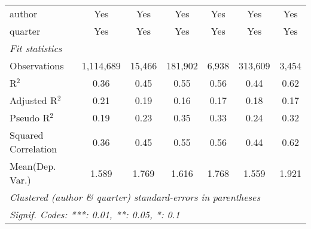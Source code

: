 \begin{tabular}{lcccccc}
   author                                                     & Yes            & Yes           & Yes           & Yes          & Yes            & Yes\\  
   quarter                                                    & Yes            & Yes           & Yes           & Yes          & Yes            & Yes\\  
   \midrule
   \emph{Fit statistics}\\
   Observations                                               & 1,114,689      & 15,466        & 181,902       & 6,938        & 313,609        & 3,454\\  
   R$^2$                                                      & 0.36           & 0.45          & 0.55          & 0.56         & 0.44           & 0.62\\  
   Adjusted R$^2$                                             & 0.21           & 0.19          & 0.16          & 0.17         & 0.18           & 0.17\\  
   Pseudo R$^2$                                               & 0.19           & 0.23          & 0.35          & 0.33         & 0.24           & 0.32\\  
   Squared Correlation                                        & 0.36           & 0.45          & 0.55          & 0.56         & 0.44           & 0.62\\  
Mean(Dep. Var.) & 1.589 & 1.769 & 1.616 & 1.768 & 1.559 & 1.921 \\
   \midrule \midrule
   \multicolumn{7}{l}{\emph{Clustered (author \& quarter) standard-errors in parentheses}}\\
   \multicolumn{7}{l}{\emph{Signif. Codes: ***: 0.01, **: 0.05, *: 0.1}}\\
\end{tabular}
\par\endgroup
